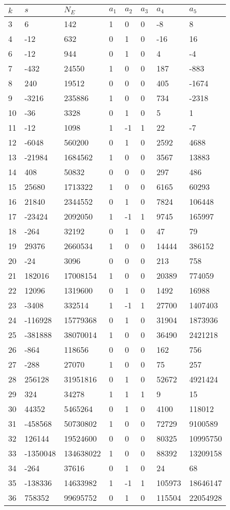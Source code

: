 \documentclass{amsart}
\begin{document}
\begin{longtable}{|l|l|l|lllll|}
\hline
$k$ & $s$ & $N_E$ & $a_1$ & $a_2$ & $a_3$ & $a_4$ & $a_5$\\
\hline
3&6&142&1&0&0&-8&8\\
4&-12&632&0&1&0&-16&16\\
6&-12&944&0&1&0&4&-4\\
7&-432&24550&1&0&0&187&-883\\
8&240&19512&0&0&0&405&-1674\\
9&-3216&235886&1&0&0&734&-2318\\
10&-36&3328&0&1&0&5&1\\
11&-12&1098&1&-1&1&22&-7\\
12&-6048&560200&0&1&0&2592&4688\\
13&-21984&1684562&1&0&0&3567&13883\\
14&408&50832&0&0&0&297&486\\
15&25680&1713322&1&0&0&6165&60293\\
16&21840&2344552&0&1&0&7824&106448\\
17&-23424&2092050&1&-1&1&9745&165997\\
18&-264&32192&0&1&0&47&79\\
19&29376&2660534&1&0&0&14444&386152\\
20&-24&3096&0&0&0&213&758\\
21&182016&17008154&1&0&0&20389&774059\\
22&12096&1319600&0&1&0&1492&16988\\
23&-3408&332514&1&-1&1&27700&1407403\\
24&-116928&15779368&0&1&0&31904&1873936\\
25&-381888&38070014&1&0&0&36490&2421218\\
26&-864&118656&0&0&0&162&756\\
27&-288&27070&1&0&0&75&257\\
28&256128&31951816&0&1&0&52672&4921424\\
29&324&34278&1&1&1&9&15\\
30&44352&5465264&0&1&0&4100&118012\\
31&-458568&50730802&1&0&0&72729&9100589\\
32&126144&19524600&0&0&0&80325&10995750\\
33&-1350048&134638022&1&0&0&88392&13209158\\
34&-264&37616&0&1&0&24&68\\
35&-138336&14633982&1&-1&1&105973&18646147\\
36&758352&99695752&0&1&0&115504&22054928\\

\end{longtable}
\end{document}
